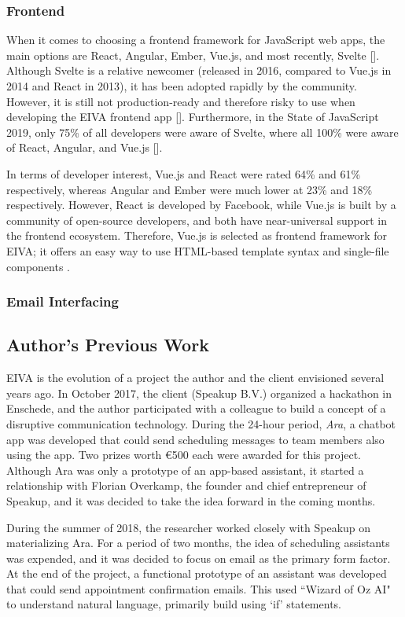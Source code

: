 \documentclass{article}
\begin{document}
\subsubsection{Frontend}

When it comes to choosing a frontend framework for JavaScript web apps, the main options are React, Angular, Ember, Vue.js, and most recently, Svelte []. Although Svelte is a relative newcomer (released in 2016, compared to Vue.js in 2014 and React in 2013), it has been adopted rapidly by the community. However, it is still not production-ready and therefore risky to use when developing the EIVA frontend app []. Furthermore, in the State of JavaScript 2019, only 75\% of all developers were aware of Svelte, where all 100\% were aware of React, Angular, and Vue.js [].

In terms of developer interest, Vue.js and React were rated 64\% and 61\% respectively, whereas Angular and Ember were much lower at 23\% and 18\% respectively. However, React is developed by Facebook, while Vue.js is built by a community of open-source developers, and both have near-universal support in the frontend ecosystem. Therefore, Vue.js is selected as frontend framework for EIVA; it offers an easy way to use HTML-based template syntax and single-file components \cite{deng_development_2020}.

\subsubsection{Email Interfacing}

\subsection{Author's Previous Work}

EIVA is the evolution of a project the author and the client envisioned several years ago. In October 2017, the client (Speakup B.V.) organized a hackathon in Enschede, and the author participated with a colleague to build a concept of a disruptive communication technology. During the 24-hour period, \emph{Ara}, a chatbot app was developed that could send scheduling messages to team members also using the app. Two prizes worth €500 each were awarded for this project. Although Ara was only a prototype of an app-based assistant, it started a relationship with Florian Overkamp, the founder and chief entrepreneur of Speakup, and it was decided to take the idea forward in the coming months.

During the summer of 2018, the researcher worked closely with Speakup on materializing Ara. For a period of two months, the idea of scheduling assistants was expended, and it was decided to focus on email as the primary form factor. At the end of the project, a functional prototype of an assistant was developed that could send appointment confirmation emails. This used ``Wizard of Oz AI" to understand natural language, primarily build using `if' statements.
\end{document}
